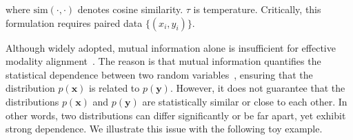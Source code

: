 where \(\text{sim}(\cdot,\cdot)\) denotes cosine similarity. \(\tau\) is temperature. Critically, this formulation requires paired data \(\{(x_i, y_i)\}\). %




Although widely adopted, mutual information alone is insufficient for effective modality alignment~\citep{liang2022mind}.  
%
%
{The reason is that mutual information quantifies the statistical dependence between two random variables~\citep{cover1999elements}, ensuring that the distribution \( p(\mathbf{x}) \) is related to \( p(\mathbf{y}) \). However, it does not guarantee that the distributions \( p(\mathbf{x}) \) and \( p(\mathbf{y}) \) are statistically similar or close to each other.} 
In other words, two distributions can differ significantly or be far apart, yet exhibit strong dependence. 
We illustrate this issue with the following toy example. 
